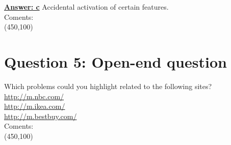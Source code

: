 \documentclass[12pt,a4paper,norsk]{article}
\begin{document}
\underline{\textbf{Answer: c}} Accidental activation of certain features. \\

\noindent Coments:\\
\framebox(450,100){}\\

\section {Question 5: Open-end question} Which problems could you highlight related to the following sites?\\
\href{http://m.nbc.com/}{http://m.nbc.com/}\\
\href{http://m.ikea.com/}{http://m.ikea.com/}\\
\href{http://m.bestbuy.com/}{http://m.bestbuy.com/}\\


\noindent Coments:\\
\framebox(450,100){}\\
\end{document}
